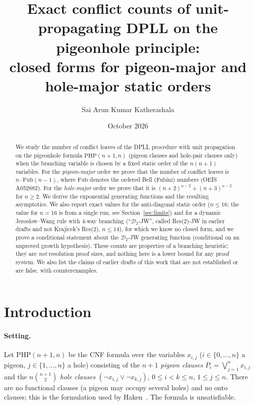 \documentclass[11pt]{article}
\title{Exact conflict counts of unit-propagating DPLL on the pigeonhole principle:\\
closed forms for pigeon-major and hole-major static orders}
\author{Sai Arun Kumar Katherashala}
\date{October 2026}
\theoremstyle{definition}
\theoremstyle{remark}
\newcommand{\PHP}{\mathrm{PHP}}
\newcommand{\Fub}{\mathrm{Fub}}
\begin{document}
\maketitle

\begin{abstract}
We study the number of conflict leaves of the DPLL procedure with unit propagation on the
pigeonhole formula $\PHP(n{+}1,n)$ (pigeon clauses and hole-pair clauses only) when the
branching variable is chosen by a fixed static order of the $n(n{+}1)$ variables. For the
\emph{pigeon-major} order we prove that the number of conflict leaves is $n\cdot\Fub(n{-}1)$, where
$\Fub$ denotes the ordered Bell (Fubini) numbers (OEIS A052882). For the \emph{hole-major} order
we prove that it is $(n+2)^{n-2}+(n+3)^{n-2}$ for $n\ge 2$. We derive the exponential generating
functions and the resulting asymptotics. We also report exact values for the anti-diagonal static
order ($n\le 16$; the value for $n=16$ is from a single run, see Section~\ref{sec:limits}) and for a dynamic Jeroslow--Wang rule with 4-way branching (``$\mathcal D_2$-JW'', called Res(2)-JW in earlier drafts and not Krajicek's Res(2),
$n\le 14$), for which we know no closed form, and we prove a conditional statement about the
$\mathcal D_2$-JW generating function (conditional on an unproved growth hypothesis). These counts are
properties of a branching heuristic; they are \emph{not} resolution proof sizes, and nothing here
is a lower bound for any proof system. We also list the claims of earlier drafts of this work that
are not established or are false, with counterexamples.
\end{abstract}

\section{Introduction}\label{sec:intro}

\paragraph{Setting.}
Let $\PHP(n{+}1,n)$ be the CNF formula over the variables $x_{i,j}$
($i\in\{0,\dots,n\}$ a pigeon, $j\in\{1,\dots,n\}$ a hole) consisting of the $n{+}1$
\emph{pigeon clauses} $P_i=\bigvee_{j=1}^n x_{i,j}$ and the $n\binom{n+1}{2}$ \emph{hole clauses}
$(\neg x_{i,j}\vee\neg x_{k,j})$, $0\le i<k\le n$, $1\le j\le n$. There are no functional
clauses (a pigeon may occupy several holes) and no onto clauses; this is the formulation used by
Haken~\cite{Haken85}. The formula is unsatisfiable.
\end{document}

